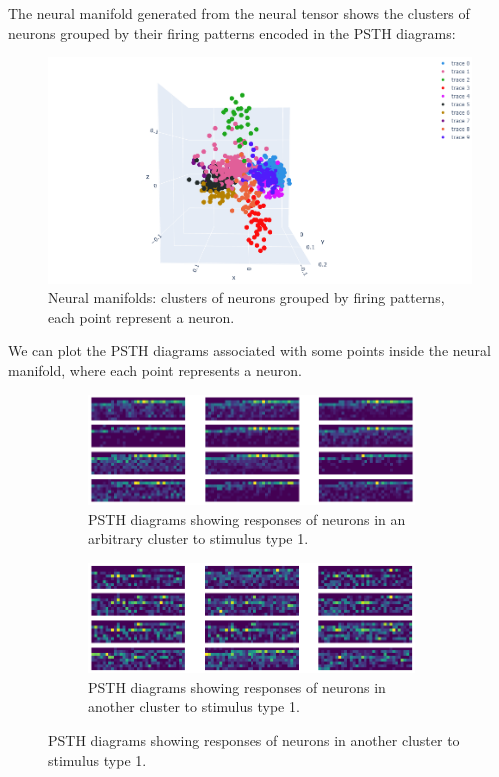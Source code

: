 The neural manifold generated from the neural tensor shows the clusters of neurons grouped by their firing patterns encoded in the PSTH diagrams:
    \begin{figure}[H]
        \centering
            \includegraphics[width=\textwidth]{figures/embeddings/embedding-lab.png}
            \caption{Neural manifolds: clusters of neurons grouped by firing patterns, each point represent a neuron.}
        \end{figure} 

We can plot the PSTH diagrams associated with some points inside the neural manifold, where each point represents a neuron. 

      \begin{figure}[H]
            \centering
            \begin{subfigure}[b]{\textwidth}
                \includegraphics[width=0.95\textwidth]{presentation/figures-retina-results/cluster20.png}
                \caption{PSTH diagrams showing responses of neurons in an arbitrary cluster to stimulus type 1.}
            \end{subfigure}
            \vfill 
            \begin{subfigure}[b]{\textwidth}
                \includegraphics[width=0.95\textwidth]{presentation/figures-retina-results/cluster10.png}
                \caption{PSTH diagrams showing responses of neurons in another cluster to stimulus type 1.}
            \end{subfigure}
            \end{figure} 


